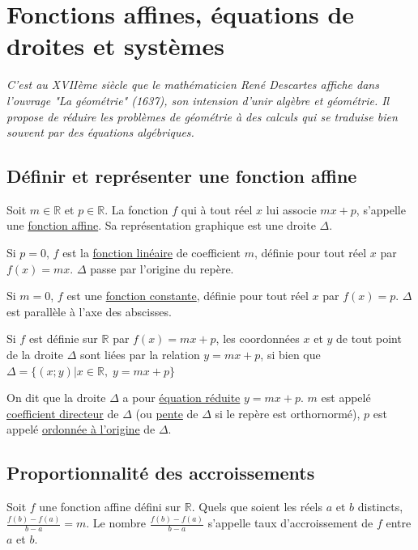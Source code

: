\documentclass[french]{book}
\begin{document}
 \setcounter{chapter}{10}
\chapter{Fonctions affines, équations de droites et systèmes}

\textit{C'est au XVIIème siècle que le mathématicien René Descartes affiche dans  l'ouvrage "La géométrie" (1637), son intension d'unir algèbre et géométrie. Il propose de réduire les problèmes de géométrie à des calculs qui se traduise bien souvent par des équations algébriques.}


\section{Définir et représenter une fonction affine}

\begin{defn}
Soit $m \in \mathbb{R}$ et $p \in \mathbb{R}$. La fonction $f$ qui à tout réel $x$ lui associe $mx+p$, s'appelle une \underline{fonction affine}. Sa représentation graphique est une droite $\Delta$.

Si $p=0$, $f$ est la \underline{fonction linéaire} de coefficient $m$, définie pour tout réel $x$ par $f(x)=mx$. $\Delta$ passe par l'origine du repère.

Si $m=0$, $f$ est une \underline{fonction constante}, définie pour tout réel $x$ par $f(x)=p$. $\Delta$ est parallèle à l'axe des abscisses.
\end{defn}

\begin{rem}
Si $f$ est définie sur $\mathbb{R}$ par $f(x)=mx+p$, les coordonnées $x$ et $y$ de tout point de la droite $\Delta$ sont liées par la relation $y=mx+p$, si bien que $\Delta= \{ (x;y)  \vert x \in \mathbb{R}, \; y=mx+p \} $ 
\end{rem}

On dit que la droite $\Delta$  a pour \underline{équation réduite} $y=mx+p$. $m$ est appelé \underline{ coefficient directeur} de $\Delta$ (ou \underline{pente} de $\Delta$ si le repère est orthornormé), $p$ est appelé \underline{ordonnée à l'origine} de $\Delta$.

\section{Proportionnalité des accroissements}


\begin{prop}
Soit $f$ une fonction affine défini sur $\mathbb{R}$. Quels que soient les réels $a$ et $b$ distincts, $\frac{f(b)-f(a)}{b-a} = m$. Le nombre $\frac{f(b)-f(a)}{b-a}$ s'appelle taux d'accroissement de $f$ entre $a$ et $b$.
\end{prop}
\end{document}
